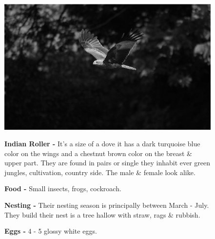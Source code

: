 \begin{figure}[H]
\begin{center}
\includegraphics{figure/Land_birds/01_pariah_kite/pariah-kite.eps}
\end{center}
\medskip
\noindent
{\bf Indian Roller -} It's a size of a dove it has a dark turquoise blue color on the wings and a chestnut brown color on the breast \& upper part. They are found in pairs or single they inhabit ever green jungles, cultivation, country side. The male \& female look alike. 

\medskip
{\bf Food -} Small insects, frogs, cockroach.

{\bf Nesting -} Their nesting season is principally between March - July. They build their nest is a tree hallow with straw, rags \& rubbish.

{\bf Eggs -} 4 - 5 glossy white eggs. 
\end{figure}

\vfill\eject

~\phantom{a}
\vfill

